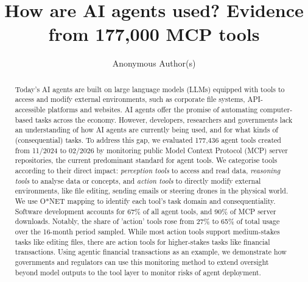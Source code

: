 \documentclass[manuscript,screen,nonacm,oneside]{acmart}
\begin{document}
\title[How are AI agents used? Evidence from 177,000 MCP ...]{How are AI agents used? Evidence from 177,000 MCP tools}

\author{Anonymous Author(s)}
\email{}

\renewcommand{\shortauthors}{Anonymous}

\begin{abstract}
Today's AI agents are built on large language models (LLMs) equipped with tools to access and modify external environments, such as corporate file systems, API-accessible platforms and websites. AI agents offer the promise of automating computer-based tasks across the economy. However, developers, researchers and governments lack an understanding of how AI agents are currently being used, and for what kinds of (consequential) tasks. To address this gap, we evaluated 177,436 agent tools created from 11/2024 to 02/2026 by monitoring public Model Context Protocol (MCP) server repositories, the current predominant standard for agent tools. We categorise tools according to their direct impact: \emph{perception tools} to access and read data, \emph{reasoning tools} to analyse data or concepts, and \emph{action tools} to directly modify external environments, like file editing, sending emails or steering drones in the physical world. We use O*NET mapping to identify each tool's task domain and consequentiality. Software development accounts for 67\% of all agent tools, and 90\% of MCP server downloads. Notably, the share of 'action' tools rose from 27\% to 65\% of total usage over the 16-month period sampled. While most action tools support medium-stakes tasks like editing files, there are action tools for higher-stakes tasks like financial transactions. Using agentic financial transactions as an example, we demonstrate how governments and regulators can use this monitoring method to extend oversight beyond model outputs to the tool layer to monitor risks of agent deployment.
\end{abstract}

\end{document}
